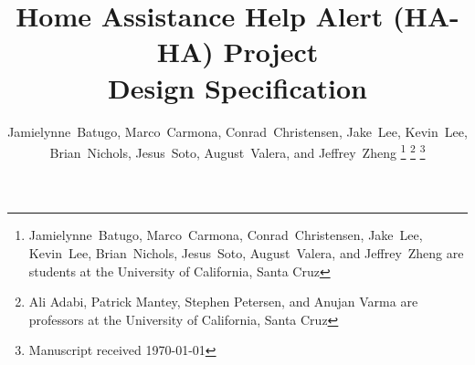 \documentclass[journal,compsoc]{IEEEtran}
\begin{document}
%
\title{
  Home Assistance Help Alert (HA-HA) Project \\
  Design Specification
}
%
%
%

\author{Jamielynne~Batugo, Marco~Carmona, Conrad~Christensen, Jake~Lee, Kevin~Lee, Brian~Nichols, Jesus~Soto, August~Valera, and Jeffrey~Zheng%
  \thanks{Jamielynne~Batugo, Marco~Carmona, Conrad~Christensen, Jake~Lee, Kevin~Lee, Brian~Nichols, Jesus~Soto, August~Valera, and Jeffrey~Zheng are students at the University of California, Santa Cruz}%
  \thanks{Ali Adabi, Patrick Mantey, Stephen Petersen, and Anujan Varma are professors at the University of California, Santa Cruz}%
\thanks{Manuscript received \today}}

%
%
\end{document}
